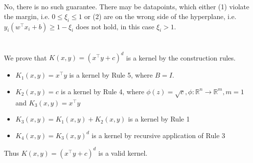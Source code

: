 \documentclass[11pt]{article}
\newcommand{\exercise}{\section{}}
\newcommand{\tf}[1]{{#1}^{\intercal}}
\begin{document}
\exercise

No, there is no such guarantee. There may be datapoints, which either (1) violate the margin, i.e. $0 \le \xi_i \le 1$ or (2) are on the wrong side of the hyperplane, i.e. $y_i (\tf{w} x_i + b) \ge 1 - \xi_i$ does not hold, in this case $\xi_i > 1$.

\exercise



\exercise

We prove that $ K(x,y) = ( \tf{x} y + c)^d $ is a kernel by the construction rules.

\begin{itemize}
\item $K_1(x, y) = \tf{x} y$ is a kernel by Rule 5, where $B = I$.
\item $K_2(x, y) = c$ is a kernel by Rule 4, where $ \phi(z) = \sqrt{c}, \phi : \mathbb{R}^n \rightarrow \mathbb{R}^m, m = 1$ and $K_3(x, y) = \tf{x} y $
\item $K_3(x, y) = K_1(x, y) + K_2(x, y)$ is a kernel by Rule 1
\item $K_4(x, y) = K_3(x, y)^d$ is a kernel by recursive application of Rule 3
\end{itemize}

Thus $ K(x,y) = ( \tf{x} y + c)^d $ is a valid kernel.

\exercise

\exercise

\exercise

\exercise
\end{document}

